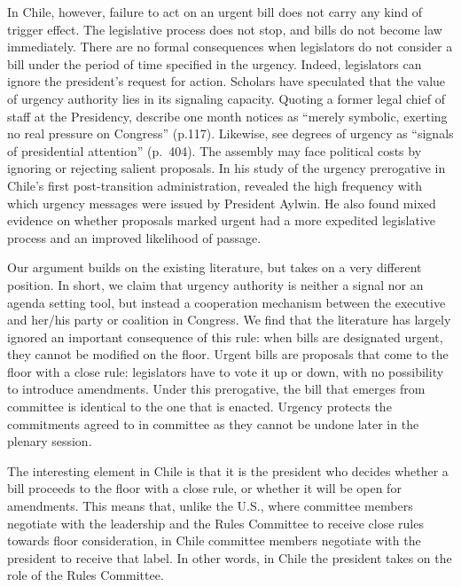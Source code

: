 \documentclass[letter,12pt]{article}
\begin{document}
In Chile, however, failure to act on an urgent bill does not carry any kind of trigger effect. The legislative process does not stop, and bills do not become law immediately. There are no formal consequences when legislators do not consider a bill under the period of time specified in the urgency. Indeed, legislators can ignore the president's request for action.  Scholars have speculated that the value of urgency authority lies in its signaling capacity. Quoting a former legal chief of staff at the Presidency, \citet{berrios.gamboa.fiscChile.2006} describe one month notices as ``merely symbolic, exerting no real pressure on Congress'' (p.117). Likewise, \citet{aleman.navia.UrgChi.2009} see degrees of urgency as ``signals of presidential attention'' (p.~404). The assembly may face political costs by ignoring or rejecting salient proposals. In his study of the urgency prerogative in Chile's first post-transition administration,  \citet{siavelis.2002}  revealed the high frequency with which urgency messages were issued by President Aylwin. He also found mixed evidence on whether proposals marked urgent had a more expedited legislative process and an improved likelihood of passage. 

Our argument builds on the existing literature, but takes on a very different position.  In short, we claim that urgency authority is neither a signal nor an agenda setting tool, but instead a cooperation mechanism between the executive and her/his party or coalition in Congress. We find that the literature has largely ignored an important consequence of this rule: when bills are designated urgent, they cannot be modified on the floor. Urgent bills are proposals that come to the floor with a close rule:  legislators have to vote it up or down, with no possibility to introduce amendments.  Under this prerogative, the bill that emerges from committee is identical to the one that is enacted. Urgency protects the commitments agreed to in committee as they cannot be undone later in the plenary session. 

The interesting element in Chile is that it is the president who decides whether a bill proceeds to the floor with a close rule, or whether it will be open for amendments. This means that, unlike the U.S., where committee members negotiate with the leadership and the Rules Committee to receive close rules towards floor consideration, in Chile committee members negotiate with the president to receive that label. In other words, in Chile the president takes on the role of the Rules Committee. 
\end{document}

